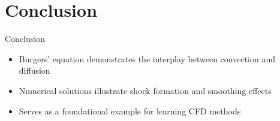 \documentclass{beamer}
\begin{document}
\section{Conclusion}
\begin{frame}{Conclusion}
\begin{itemize}
    \item Burgers' equation demonstrates the interplay between convection and diffusion
    \item Numerical solutions illustrate shock formation and smoothing effects
    \item Serves as a foundational example for learning CFD methods
\end{itemize}
\end{frame}
\end{document}

